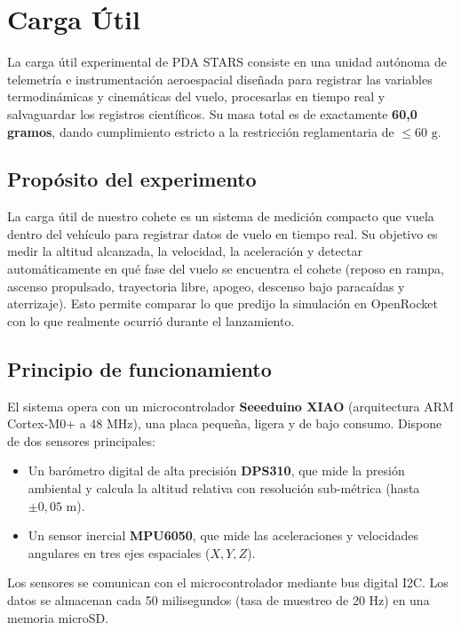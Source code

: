 \section{Carga Útil}

La carga útil experimental de PDA STARS consiste en una unidad autónoma de telemetría e instrumentación aeroespacial diseñada para registrar las variables termodinámicas y cinemáticas del vuelo, procesarlas en tiempo real y salvaguardar los registros científicos. Su masa total es de exactamente \textbf{60,0 gramos}, dando cumplimiento estricto a la restricción reglamentaria de $\le 60\text{ g}$.

\subsection*{Propósito del experimento}
La carga útil de nuestro cohete es un sistema de medición compacto que vuela dentro del vehículo para registrar datos de vuelo en tiempo real. Su objetivo es medir la altitud alcanzada, la velocidad, la aceleración y detectar automáticamente en qué fase del vuelo se encuentra el cohete (reposo en rampa, ascenso propulsado, trayectoria libre, apogeo, descenso bajo paracaídas y aterrizaje). Esto permite comparar lo que predijo la simulación en OpenRocket con lo que realmente ocurrió durante el lanzamiento.

\subsection*{Principio de funcionamiento}
El sistema opera con un microcontrolador \textbf{Seeeduino XIAO} (arquitectura ARM Cortex-M0+ a 48 MHz), una placa pequeña, ligera y de bajo consumo. Dispone de dos sensores principales:
\begin{itemize}[leftmargin=1.5em]
    \item Un barómetro digital de alta precisión \textbf{DPS310}, que mide la presión ambiental y calcula la altitud relativa con resolución sub-métrica (hasta $\pm 0,05\text{ m}$).
    \item Un sensor inercial \textbf{MPU6050}, que mide las aceleraciones y velocidades angulares en tres ejes espaciales ($X, Y, Z$).
\end{itemize}
Los sensores se comunican con el microcontrolador mediante bus digital I2C. Los datos se almacenan cada 50 milisegundos (tasa de muestreo de 20 Hz) en una memoria microSD.

